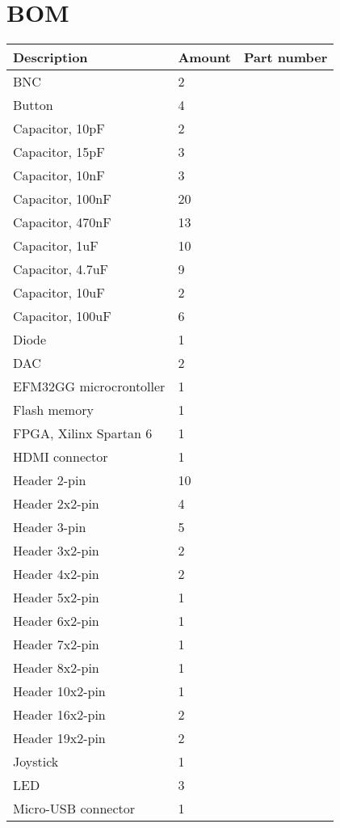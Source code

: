\chapter{BOM}
\label{app:bom}
\begin{longtable}{| p{5cm} | p{2cm} | p{2cm} |}
	\hline
	\textbf{Description} & \textbf{Amount} & \textbf{Part number} \\ [0.5ex] 
	\hline
	BNC & 2 &\\ \hline
	Button & 4 &\\ \hline
	Capacitor, 10pF & 2 &\\ \hline
	Capacitor, 15pF & 3 &\\ \hline
	Capacitor, 10nF & 3 &\\ \hline
	Capacitor, 100nF & 20 &\\ \hline
	Capacitor, 470nF & 13 &\\ \hline
	Capacitor, 1uF & 10 &\\ \hline
	Capacitor, 4.7uF & 9 &\\ \hline
	Capacitor, 10uF & 2 &\\ \hline
	Capacitor, 100uF & 6 &\\ \hline
	Diode & 1 &\\ \hline
	DAC & 2 &\\ \hline
	EFM32GG microcrontoller & 1 &\\ \hline
	Flash memory & 1 &\\ \hline
	FPGA, Xilinx Spartan 6 & 1 &\\ \hline
	HDMI connector & 1 &\\ \hline
	Header 2-pin & 10 &\\ \hline
	Header 2x2-pin & 4 &\\ \hline
	Header 3-pin & 5 &\\ \hline
	Header 3x2-pin & 2 &\\ \hline
	Header 4x2-pin & 2 &\\ \hline
	Header 5x2-pin & 1 &\\ \hline
	Header 6x2-pin & 1 &\\ \hline
	Header 7x2-pin & 1 &\\ \hline
	Header 8x2-pin & 1 &\\ \hline
	Header 10x2-pin & 1 &\\ \hline
	Header 16x2-pin & 2 &\\ \hline
	Header 19x2-pin & 2 &\\ \hline
	Joystick & 1 &\\ \hline
	LED & 3 &\\ \hline
	Micro-USB connector & 1 &\\ \hline

\end{longtable}
